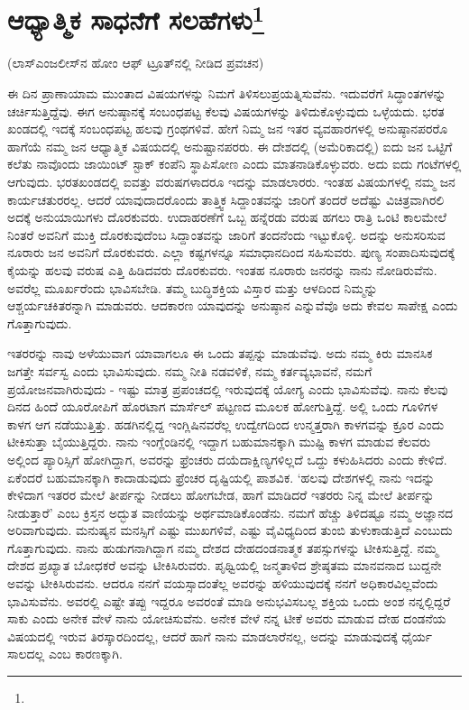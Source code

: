 
\chapter[ಆಧ್ಯಾತ್ಮಿಕ ಸಾಧನೆಗೆ ಸಲಹೆಗಳು]{ಆಧ್ಯಾತ್ಮಿಕ ಸಾಧನೆಗೆ ಸಲಹೆಗಳು\protect\footnote{}}

\begin{center}
(ಲಾಸ್‌ಎಂಜಲೀಸ್‌ನ ಹೋಂ ಆಫ್ ಟ್ರೂತ್‌ನಲ್ಲಿ ನೀಡಿದ ಪ್ರವಚನ)
\end{center}

ಈ ದಿನ ಪ್ರಾಣಾಯಾಮ ಮುಂತಾದ ವಿಷಯಗಳನ್ನು ನಿಮಗೆ ತಿಳಿಸಲು\break ಪ್ರಯತ್ನಿಸುವೆನು. ಇದುವರೆಗೆ ಸಿದ್ಧಾಂತಗಳನ್ನು ಚರ್ಚಿಸುತ್ತಿದ್ದೆವು. ಈಗ ಅನುಷ್ಠಾನಕ್ಕೆ ಸಂಬಂಧಪಟ್ಟ ಕೆಲವು ವಿಷಯಗಳನ್ನು ತಿಳಿದುಕೊಳ್ಳುವುದು ಒಳ್ಳೆಯದು. ಭರತ ಖಂಡದಲ್ಲಿ ಇದಕ್ಕೆ ಸಂಬಂಧಪಟ್ಟ ಹಲವು ಗ್ರಂಥಗಳಿವೆ. ಹೇಗೆ ನಿಮ್ಮ ಜನ ಇತರ ವ್ಯವಹಾರಗಳಲ್ಲಿ ಅನುಷ್ಠಾನಪರರೊ ಹಾಗೆಯೆ ನಮ್ಮ ಜನ ಆಧ್ಯಾತ್ಮಿಕ ವಿಷಯದಲ್ಲಿ ಅನುಷ್ಟಾನಪರರು. ಈ ದೇಶದಲ್ಲಿ (ಅಮೆರಿಕಾದಲ್ಲಿ) ಐದು ಜನ ಒಟ್ಟಿಗೆ ಕಲೆತು ನಾವೊಂದು ಜಾಯಿಂಟ್ ಸ್ಟಾಕ್ ಕಂಪೆನಿ ಸ್ಥಾಪಿಸೋಣ ಎಂದು ಮಾತನಾಡಿಕೊಳ್ಳುವರು. ಅದು ಐದು ಗಂಟೆಗಳಲ್ಲಿ ಆಗುವುದು. ಭರತಖಂಡದಲ್ಲಿ ಐವತ್ತು ವರುಷಗಳಾದರೂ ಇದನ್ನು ಮಾಡಲಾರರು. ಇಂತಹ ವಿಷಯಗಳಲ್ಲಿ ನಮ್ಮ ಜನ ಕಾರ್ಯಚತುರರಲ್ಲ. ಆದರೆ ಯಾವುದಾದರೊಂದು ತಾತ್ತ್ವಿಕ ಸಿದ್ದಾಂತವನ್ನು ಜಾರಿಗೆ ತಂದರೆ ಅದೆಷ್ಟು ವಿಚಿತ್ರವಾಗಿರಲಿ ಅದಕ್ಕೆ ಅನುಯಾಯಿಗಳು ದೊರಕುವರು. ಉದಾಹರಣೆಗೆ ಒಬ್ಬ ಹನ್ನೆರಡು ವರುಷ ಹಗಲು ರಾತ್ರಿ ಒಂಟಿ ಕಾಲಮೇಲೆ ನಿಂತರೆ ಅವನಿಗೆ ಮುಕ್ತಿ ದೊರಕುವುದೆಂಬ ಸಿದ್ದಾಂತವನ್ನು ಜಾರಿಗೆ ತಂದನೆಂದು ಇಟ್ಟುಕೊಳ್ಳಿ. ಅದನ್ನು ಅನುಸರಿಸುವ ನೂರಾರು ಜನ ಅವನಿಗೆ ದೊರಕುವರು. ಎಲ್ಲಾ ಕಷ್ಟಗಳನ್ನೂ ಸಮಾಧಾನದಿಂದ ಸಹಿಸುವರು. ಪುಣ್ಯ ಸಂಪಾದಿಸುವುದಕ್ಕೆ ಕೈಯನ್ನು ಹಲವು ವರುಷ ಎತ್ತಿ ಹಿಡಿದವರು ದೊರಕುವರು. ಇಂತಹ ನೂರಾರು ಜನರನ್ನು ನಾನು ನೋಡಿರುವೆನು. ಅವರೆಲ್ಲ ಮೂರ್ಖರೆಂದು ಭಾವಿಸಬೇಡಿ. ತಮ್ಮ ಬುದ್ಧಿಶಕ್ತಿಯ ವಿಸ್ತಾರ ಮತ್ತು ಆಳದಿಂದ ನಿಮ್ಮನ್ನು ಆಶ್ಚರ್ಯಚಕಿತರನ್ನಾಗಿ ಮಾಡುವರು. ಆದಕಾರಣ ಯಾವುದನ್ನು ಅನುಷ್ಠಾನ ಎನ್ನುವೆವೊ ಅದು ಕೇವಲ ಸಾಪೇಕ್ಷ ಎಂದು ಗೊತ್ತಾಗುವುದು.

ಇತರರನ್ನು ನಾವು ಅಳೆಯುವಾಗ ಯಾವಾಗಲೂ ಈ ಒಂದು ತಪ್ಪನ್ನು ಮಾಡುವೆವು. ಅದು ನಮ್ಮ ಕಿರು ಮಾನಸಿಕ ಜಗತ್ತೇ ಸರ್ವಸ್ವ ಎಂದು ಭಾವಿಸುವುದು. ನಮ್ಮ ನೀತಿ ನಡವಳಿಕೆ, ನಮ್ಮ ಕರ್ತವ್ಯಭಾವನೆ, ನಮಗೆ ಪ್ರಯೋಜನವಾಗಿರುವುದು - ಇಷ್ಟು ಮಾತ್ರ ಪ್ರಪಂಚದಲ್ಲಿ ಇರುವುದಕ್ಕೆ ಯೋಗ್ಯ ಎಂದು ಭಾವಿಸುವೆವು. ನಾನು ಕೆಲವು ದಿನದ ಹಿಂದೆ ಯೂರೋಪಿಗೆ ಹೊರಟಾಗ ಮಾರ್ಸೆಲ್ ಪಟ್ಟಣದ ಮೂಲಕ ಹೋಗುತ್ತಿದ್ದೆ. ಅಲ್ಲಿ ಒಂದು ಗೂಳಿಗಳ ಕಾಳಗ ಆಗ ನಡೆಯುತ್ತಿತ್ತು. ಹಡಗಿನಲ್ಲಿದ್ದ ಇಂಗ್ಲಿಷಿನವರೆಲ್ಲ ಉದ್ವೇಗದಿಂದ ಉನ್ಮತ್ತರಾಗಿ ಕಾಳಗವನ್ನು ಕ್ರೂರ ಎಂದು ಟೀಕಿಸುತ್ತಾ ಬೈಯುತ್ತಿದ್ದರು. ನಾನು ಇಂಗ್ಲೆಂಡಿನಲ್ಲಿ ಇದ್ದಾಗ ಬಹುಮಾನಕ್ಕಾಗಿ ಮುಷ್ಟಿ ಕಾಳಗ ಮಾಡುವ ಕೆಲವರು ಅಲ್ಲಿಂದ ಪ್ಯಾರಿಸ್ಸಿಗೆ ಹೋಗಿದ್ದಾಗ, ಅವರನ್ನು ಫ್ರೆಂಚರು ದಯೆದಾಕ್ಷಿಣ್ಯಗಳಿಲ್ಲದೆ ಒದ್ದು ಕಳುಹಿಸಿದರು ಎಂದು ಕೇಳಿದೆ. ಏಕೆಂದರೆ ಬಹುಮಾನಕ್ಕಾಗಿ ಕಾದಾಡುವುದು ಫ್ರೆಂಚರ ದೃಷ್ಟಿಯಲ್ಲಿ ಪಾಶವಿಕ. `ಹಲವು ದೇಶಗಳಲ್ಲಿ ನಾನು ಇದನ್ನು ಕೇಳಿದಾಗ ಇತರರ ಮೇಲೆ ತೀರ್ಪನ್ನು ನೀಡಲು ಹೋಗಬೇಡ, ಹಾಗೆ ಮಾಡಿದರೆ ಇತರರು ನಿನ್ನ ಮೇಲೆ ತೀರ್ಪನ್ನು ನೀಡುತ್ತಾರೆ' ಎಂಬ ಕ್ರಿಸ್ತನ ಅದ್ಭುತ ವಾಣಿಯನ್ನು ಅರ್ಥಮಾಡಿಕೊಂಡೆನು. ನಮಗೆ ಹೆಚ್ಚು ತಿಳಿದಷ್ಟೂ ನಮ್ಮ ಅಜ್ಞಾನದ ಅರಿವಾಗುವುದು. ಮನುಷ್ಯನ ಮನಸ್ಸಿಗೆ ಎಷ್ಟು ಮುಖಗಳಿವೆ, ಎಷ್ಟು ವೈವಿಧ್ಯದಿಂದ ತುಂಬಿ ತುಳುಕಾಡುತ್ತಿದೆ ಎಂಬುದು ಗೊತ್ತಾಗುವುದು. ನಾನು ಹುಡುಗನಾಗಿದ್ದಾಗ ನಮ್ಮ ದೇಶದ ದೇಹದಂಡನಾತ್ಮಕ ತಪಸ್ಸುಗಳನ್ನು ಟೀಕಿಸುತ್ತಿದ್ದೆ. ನಮ್ಮ ದೇಶದ ಪ್ರಖ್ಯಾತ ಬೋಧಕರೆ ಅವನ್ನು ಟೀಕಿಸಿರುವರು. ಪೃಥ್ವಿಯಲ್ಲಿ ಜನ್ಮತಾಳಿದ ಶ್ರೇಷ್ಠತಮ ಮಾನವನಾದ ಬುದ್ದನೇ ಅವನ್ನು ಟೀಕಿಸಿರುವನು. ಆದರೂ ನನಗೆ ವಯಸ್ಸಾದಂತೆಲ್ಲ ಅವರನ್ನು ಹಳಿಯುವುದಕ್ಕೆ ನನಗೆ ಅಧಿಕಾರವಿಲ್ಲವೆಂದು ಭಾವಿಸುವೆನು. ಅವರಲ್ಲಿ ಎಷ್ಟೇ ತಪ್ಪು ಇದ್ದರೂ ಅವರಂತೆ ಮಾಡಿ ಅನುಭವಿಸಬಲ್ಲ ಶಕ್ತಿಯ ಒಂದು ಅಂಶ ನನ್ನಲ್ಲಿದ್ದರೆ ಸಾಕು ಎಂದು ಅನೇಕ ವೇಳೆ ನಾನು ಯೋಚಿಸುವೆನು. ಅನೇಕ ವೇಳೆ ನನ್ನ ಟೀಕೆ ಅವರು ಮಾಡುವ ದೇಹ ದಂಡನೆಯ ವಿಷಯದಲ್ಲಿ ಇರುವ ತಿರಸ್ಕಾರದಿಂದಲ್ಲ, ಆದರೆ ಹಾಗೆ ನಾನು ಮಾಡಲಾರೆನಲ್ಲ, ಅದನ್ನು ಮಾಡುವುದಕ್ಕೆ ಧೈರ್ಯ ಸಾಲದಲ್ಲ ಎಂಬ ಕಾರಣಕ್ಕಾಗಿ.

